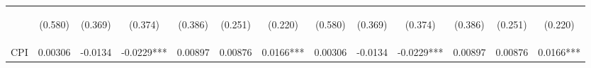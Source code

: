 \documentclass[]{article}
\begin{document}
\begin{center}
\begin{tabular}{lcccccccccccc}
\vspace{4pt} & \begin{footnotesize}(0.580)\end{footnotesize} & \begin{footnotesize}(0.369)\end{footnotesize} & \begin{footnotesize}(0.374)\end{footnotesize} & \begin{footnotesize}(0.386)\end{footnotesize} & \begin{footnotesize}(0.251)\end{footnotesize} & \begin{footnotesize}(0.220)\end{footnotesize} & \begin{footnotesize}(0.580)\end{footnotesize} & \begin{footnotesize}(0.369)\end{footnotesize} & \begin{footnotesize}(0.374)\end{footnotesize} & \begin{footnotesize}(0.386)\end{footnotesize} & \begin{footnotesize}(0.251)\end{footnotesize} & \begin{footnotesize}(0.220)\end{footnotesize} \\
CPI & 0.00306 & -0.0134 & -0.0229*** & 0.00897 & 0.00876 & 0.0166*** & 0.00306 & -0.0134 & -0.0229*** & 0.00897 & 0.00876 & 0.0166*** \\

\end{tabular}
\end{center}
\end{document}
